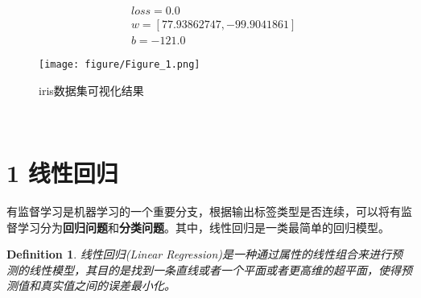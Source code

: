 \documentclass[twoside]{article}
\newtheorem{definition}{Definition}
\begin{document}
\begin{equation*}
\begin{aligned}
    &loss=0.0\\
    & w=[77.93862747,-99.9041861]\\
    & b=-121.0
\end{aligned}
\end{equation*}
\begin{figure}[htbp]
\centering
\texttt{[image: figure/Figure\_1.png]}
\caption{iris数据集可视化结果}
\label{fig:my_label}
\end{figure}
\clearpage
{} \vspace{2mm} \\
\section*{1 线性回归}
有监督学习是机器学习的一个重要分支，根据输出标签类型是否连续，可以将有监督学习分为\textbf{回归问题}和\textbf{分类问题}。其中，线性回归是一类最简单的回归模型。
\begin{definition}
    线性回归(Linear Regression)是一种通过属性的线性组合来进行预测的线性模型，其目的是找到一条直线或者一个平面或者更高维的超平面，使得预测值和真实值之间的误差最小化。
\end{definition}
\end{document}
